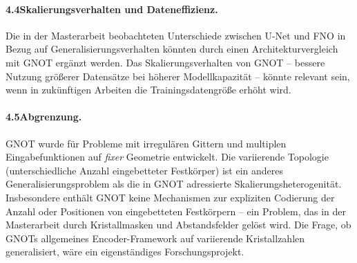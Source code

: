 \documentclass[a4paper,12pt]{article}
\begin{document}
\paragraph{4.4\quad Skalierungsverhalten und Dateneffizienz.}
Die in der Masterarbeit beobachteten Unterschiede zwischen U-Net und FNO in Bezug auf
Generalisierungsverhalten könnten durch einen Architekturvergleich mit GNOT ergänzt
werden. Das Skalierungsverhalten von GNOT -- bessere Nutzung größerer Datensätze bei
höherer Modellkapazität -- könnte relevant sein, wenn in zukünftigen Arbeiten die
Trainingsdatengröße erhöht wird.

\paragraph{4.5\quad Abgrenzung.}
GNOT wurde für Probleme mit irregulären Gittern und multiplen Eingabefunktionen auf
\emph{fixer} Geometrie entwickelt. Die variierende Topologie (unterschiedliche Anzahl
eingebetteter Festkörper) ist ein anderes Generalisierungsproblem als die in GNOT
adressierte Skalierungsheterogenität. Insbesondere enthält GNOT keine Mechanismen
zur expliziten Codierung der Anzahl oder Positionen von eingebetteten Festkörpern --
ein Problem, das in der Masterarbeit durch Kristallmasken und Abstandsfelder gelöst wird.
Die Frage, ob GNOTs allgemeines Encoder-Framework auf variierende Kristallzahlen
generalisiert, wäre ein eigenständiges Forschungsprojekt.
\end{document}
